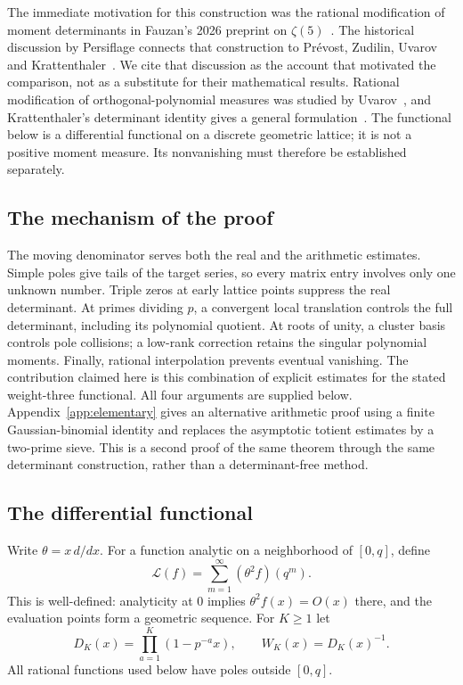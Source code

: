 \documentclass[11pt,letterpaper]{article}
\numberwithin{equation}{section}
\theoremstyle{remark}
\newcommand{\Lcal}{\mathcal L}
\begin{document}
The immediate motivation for this construction was the rational modification of moment determinants in Fauzan's 2026 preprint on $\zeta(5)$~\cite{Fauzan}. The historical discussion by Persiflage connects that construction to Pr\'evost, Zudilin, Uvarov and Krattenthaler~\cite{Persiflage}. We cite that discussion as the account that motivated the comparison, not as a substitute for their mathematical results. Rational modification of orthogonal-polynomial measures was studied by Uvarov~\cite{Uvarov}, and Krattenthaler's determinant identity gives a general formulation~\cite{Krattenthaler2021}. The functional below is a differential functional on a discrete geometric lattice; it is not a positive moment measure. Its nonvanishing must therefore be established separately.

\subsection{The mechanism of the proof}

The moving denominator serves both the real and the arithmetic estimates. Simple poles give tails of the target series, so every matrix entry involves only one unknown number. Triple zeros at early lattice points suppress the real determinant. At primes dividing $p$, a convergent local translation controls the full determinant, including its polynomial quotient. At roots of unity, a cluster basis controls pole collisions; a low-rank correction retains the singular polynomial moments. Finally, rational interpolation prevents eventual vanishing. The contribution claimed here is this combination of explicit estimates for the stated weight-three functional. All four arguments are supplied below. Appendix~\ref{app:elementary} gives an alternative arithmetic proof using a finite Gaussian-binomial identity and replaces the asymptotic totient estimates by a two-prime sieve. This is a second proof of the same theorem through the same determinant construction, rather than a determinant-free method.

\subsection{The differential functional}

Write $\theta=x\,d/dx$. For a function analytic on a neighborhood of $[0,q]$, define
\begin{equation}\label{eq:functional}
 \Lcal(f)=\sum_{m=1}^{\infty}(\theta^2f)(q^m).
\end{equation}
This is well-defined: analyticity at $0$ implies $\theta^2f(x)=O(x)$ there, and the evaluation points form a geometric sequence. For $K\ge1$ let
\begin{equation}\label{eq:denom}
 D_K(x)=\prod_{a=1}^K(1-p^{-a}x),\qquad W_K(x)=D_K(x)^{-1}.
\end{equation}
All rational functions used below have poles outside $[0,q]$.
\end{document}
